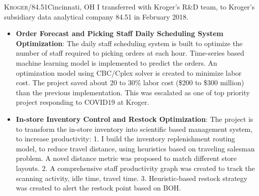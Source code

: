\documentclass[12pt,a4paper,sans]{moderncv} %
\begin{document}
\bigskip
{}
{\textsc{Kroger/84.51}}{Cincinnati, OH}{}{
I transferred with Kroger's R\&D team, to Kroger's subsidiary data analytical company 84.51 in February 2018.}
\begin{itemize}
\item \textbf{Order Forecast and Picking Staff Daily Scheduling System Optimization}: 
    The daily staff scheduling system is built to optimize the number of staff required to picking 
    orders at each hour.
    Time-series based machine learning model is implemented to predict the orders. 
    An optimization model using CBC/Cplex solver is created to minimize labor cost. 
    The project saved about 20 to 30\% labor cost (\$200 to \$300 million) than the previous implementation. 
    This was escalated as one of top priority project responding to COVID19 at Kroger.
\item \textbf{In-store Inventory Control and Restock Optimization}:
The project is to transform the in-store inventory into scientific based management system, to increase productivity:
1. I build the inventory replenishment routing model, to reduce travel distance, using heuristics based on traveling salesman problem. A novel distance metric was proposed to match different store layouts. 
2. A comprehensive staff productivity graph was created to track the scanning activity, idle time, travel time.
3. Heuristic-based restock strategy was created to alert the restock point based on BOH. 


\end{itemize}



\bigskip

{} 
{}
\end{document}
